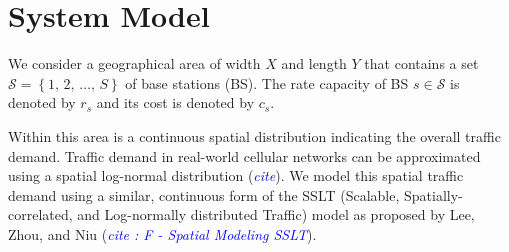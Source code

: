 \documentclass[12pt,onecolumn]{IEEEtran}
\begin{document}
%




\section{System Model}
We consider a geographical area of width $X$ and length $Y$ that contains a set $\mathcal{S} = \left\{1,\, 2,\, \ldots,\, S\right\}$ of base stations (BS).  The rate capacity of BS $s \in \mathcal{S}$ is denoted by $r_s$ and its cost is denoted by $c_s$.


Within this area is a continuous spatial distribution indicating the overall traffic demand.  Traffic demand in real-world cellular networks can be approximated using a spatial log-normal distribution (\textit{\textcolor{blue}{cite}}).  We model this spatial traffic demand using a similar, continuous form of the SSLT (Scalable, Spatially-correlated, and Log-normally distributed Traffic) model as proposed by Lee, Zhou, and Niu (\textit{\textcolor{blue}{cite : F - Spatial Modeling SSLT}}).
\end{document}
